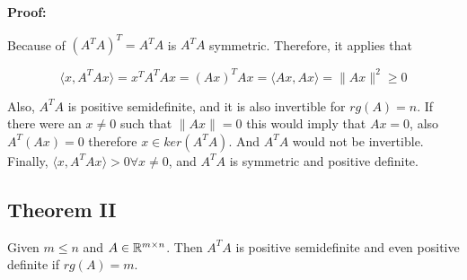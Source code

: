 \textbf{Proof:}

Because of \((A^T A)^T = A^T A\) is \(A^T A\) symmetric. Therefore, it applies that 

\[
    \langle x, A^T A x \rangle = x^T A^T A x  = (Ax)^T Ax = \langle Ax, Ax \rangle = \|Ax\|^2 \ge 0 
\]

Also, \(A^T A\) is positive semidefinite, and it is also invertible for \(rg(A) = n\). If there were an 
\(x \ne 0\) such that \(\|Ax\| = 0\) this would imply that \(Ax = 0\), also \(A^T (Ax) = 0\) therefore 
\(x \in ker(A^T A)\). And \(A^T A\) would not be invertible. Finally, 
\(\langle x, A^T Ax \rangle > 0 \forall x \ne 0\),  and \(A^T A\) is symmetric and positive definite.

\subsection{Theorem II}

Given \(m \le n\) and \(A \in \mathbb{R}^{m \times n}\). Then \(A^T A\) is positive semidefinite and even 
positive definite if \(rg(A) = m\).

